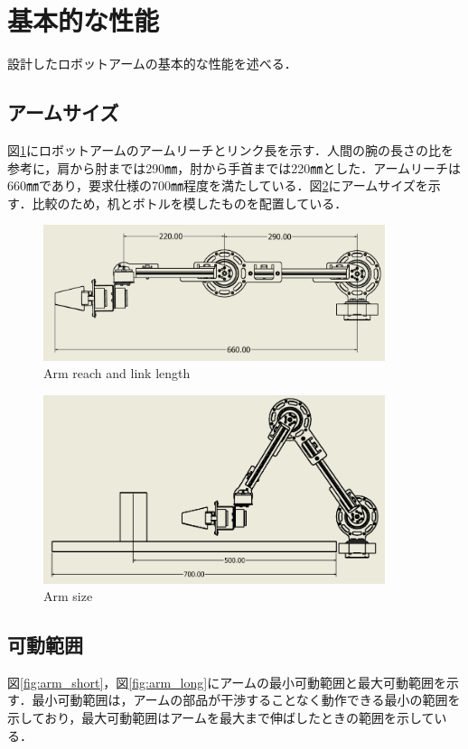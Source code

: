 \section{基本的な性能}
設計したロボットアームの基本的な性能を述べる．
\subsection{アームサイズ}
図\ref{fig:link_length}にロボットアームのアームリーチとリンク長を示す．人間の腕の長さの比\cite{humanarm:online}を参考に，肩から肘までは290㎜，肘から手首までは220㎜とした．アームリーチは660㎜であり，要求仕様の700㎜程度を満たしている．図\ref{fig:arm_size}にアームサイズを示す．比較のため，机とボトルを模したものを配置している．

\begin{figure}[htbp]
  \centering
  \includegraphics[width=10cm]{images/link_length.png}
  \caption{Arm reach and link length}
  \label{fig:link_length}
\end{figure}

\begin{figure}[htbp]
  \centering
  \includegraphics[width=10cm]{images/hikaku.png}
  \caption{Arm size}
  \label{fig:arm_size}
\end{figure}

\clearpage

\subsection{可動範囲}
図\ref{fig:arm_short}，図\ref{fig:arm_long}にアームの最小可動範囲と最大可動範囲を示す．最小可動範囲は，アームの部品が干渉することなく動作できる最小の範囲を示しており，最大可動範囲はアームを最大まで伸ばしたときの範囲を示している．

